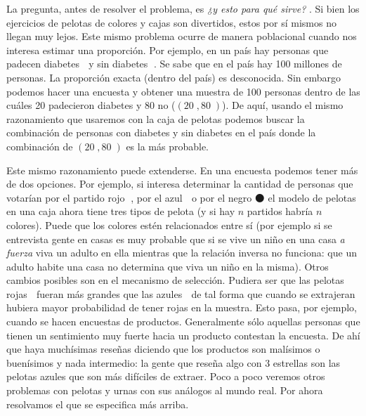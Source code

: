 \documentclass[
]{book}
\begin{document}
La pregunta, antes de resolver el problema, es \emph{¿y esto para qué sirve?} . Si bien los ejercicios de pelotas de colores y cajas son divertidos, estos por sí mismos no llegan muy lejos. Este mismo problema ocurre de manera poblacional cuando nos interesa estimar una proporción. Por ejemplo, en un país hay personas que padecen diabetes 🔴 y sin diabetes 🔵. Se sabe que en el país hay 100 millones de personas. La proporción exacta (dentro del país) es desconocida. Sin embargo podemos hacer una encuesta y obtener una muestra de 100 personas dentro de las cuáles 20 padecieron diabetes y 80 no (\((20 🔴, 80 🔵)\)). De aquí, usando el mismo razonamiento que usaremos con la caja de pelotas podemos buscar la combinación de personas con diabetes y sin diabetes en el país donde la combinación de \((20 🔴, 80 🔵)\) es la más probable.

Este mismo razonamiento puede extenderse. En una encuesta podemos tener más de dos opciones. Por ejemplo, si interesa determinar la cantidad de personas que votarían por el partido rojo 🔴, por el azul 🔵 o por el negro ⚫ el modelo de pelotas en una caja ahora tiene tres tipos de pelota (y si hay \(n\) partidos habría \(n\) colores). Puede que los colores estén relacionados entre sí (por ejemplo si se entrevista gente en casas es muy probable que si se vive un niño en una casa \emph{a fuerza} viva un adulto en ella mientras que la relación inversa no funciona: que un adulto habite una casa no determina que viva un niño en la misma). Otros cambios posibles son en el mecanismo de selección. Pudiera ser que las pelotas rojas 🔴 fueran más grandes que las azules 🔵 de tal forma que cuando se extrajeran hubiera mayor probabilidad de tener rojas en la muestra. Esto pasa, por ejemplo, cuando se hacen encuestas de productos. Generalmente sólo aquellas personas que tienen un sentimiento muy fuerte hacia un producto contestan la encuesta. De ahí que haya muchísimas reseñas diciendo que los productos son malísimos o buenísimos y nada intermedio: la gente que reseña algo con 3 estrellas son las pelotas azules que son más difíciles de extraer. Poco a poco veremos otros problemas con pelotas y urnas con sus análogos al mundo real. Por ahora resolvamos el que se especifica más arriba.
\end{document}
